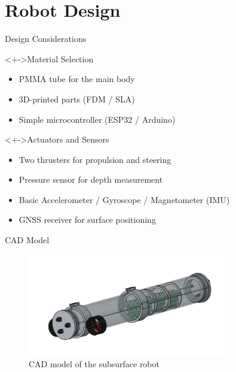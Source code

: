 \documentclass[9pt, xcolor={usenames, dvipsnames}]{beamer}
\begin{document}
    \section{Robot Design}

        \begin{frame}{Design Considerations}
            \begin{block}<+->{Material Selection}
                \begin{itemize}
                    \item PMMA tube for the main body
                    \item 3D-printed parts (FDM / SLA)
                    \item Simple microcontroller (ESP32 / Arduino)
                \end{itemize}
            \end{block}
            \begin{block}<+->{Actuators and Sensors}
                \begin{itemize}
                    \item Two thrusters for propulsion and steering
                    \item Pressure sensor for depth measurement
                    \item Basic Accelerometer / Gyroscope / Magnetometer (IMU)
                    \item GNSS receiver for surface positioning
                \end{itemize}
            \end{block}
        \end{frame}

        \begin{frame}{CAD Model}
            \begin{figure}
                \centering
                \includegraphics[width=0.8\textwidth]{imgs/cad.png}
                \caption{CAD model of the subsurface robot}
            \end{figure}
        \end{frame}
\end{document}
